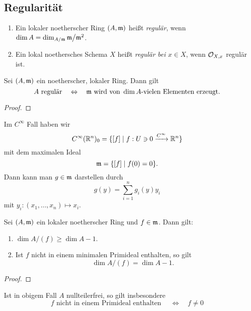 \subsection{Regularität}

\begin{definition}[regulär]
    \label{def:regular}
    \begin{enumerate}[label=(\roman*)]
      \item Ein lokaler noetherscher Ring $(A,\mathfrak{m})$ heißt \emph{regulär},
        wenn $\dim A = \dim_{A/\mathfrak{m}} \mathfrak{m}\big/\mathfrak{m}^2$.
      \item Ein lokal noethersches Schema $X$ heißt 
        \emph{regulär bei $x \in X$}, wenn $\mathcal{O}_{X,x}$ regulär ist. 
    \end{enumerate}
\end{definition}


\begin{lemma}
    Sei $(A,\mathfrak{m})$ ein noetherscher, lokaler Ring. Dann gilt
    \[A \text{ regulär} \quad\Leftrightarrow\quad
        \mathfrak{m} \text{ wird von } \dim A \text{-vielen Elementen erzeugt}.\]
\end{lemma}
\begin{proof}
\TODO
\end{proof}

\begin{bemerkung}
    Im $C^\infty$ Fall haben wir
    \[ C^\infty(\mathbb{R}^n)_0 = \{[f]\mid f: U \ni 0 \xrightarrow{C^\infty} \mathbb{R}^n\}\]
    mit dem maximalen Ideal
    \[ \mathfrak{m} = \{[f] \mid f(0) = 0\}.\]
    Dann kann man $g\in \mathfrak{m}$ darstellen durch
    \[ g(y) = \sum_{i=1}^n g_i(y) y_i\]
    mit $y_i:(x_1,\ldots,x_n) \mapsto x_i$.
\end{bemerkung}

\begin{satz}
    Sei $(A,\mathfrak{m})$ ein lokaler noetherscher Ring und $f\in \mathfrak{m}$. Dann gilt:
    \begin{enumerate}[label=(\roman*)]
      \item $\dim A\big/(f) \geq \dim A -1$.
      \item Ist $f$ nicht in einem minimalen Primideal enthalten, so gilt
        \[\dim A\big/(f) = \dim A -1. \] 
    \end{enumerate}
\end{satz}
\begin{proof}
\TODO
\end{proof}

\begin{bemerkung}
    Ist in obigem Fall $A$ nullteilerfrei, so gilt insbesondere
    \[f \text{ nicht in einem Primideal enthalten }\quad\Leftrightarrow\quad 
        f \neq 0\]
\end{bemerkung}

